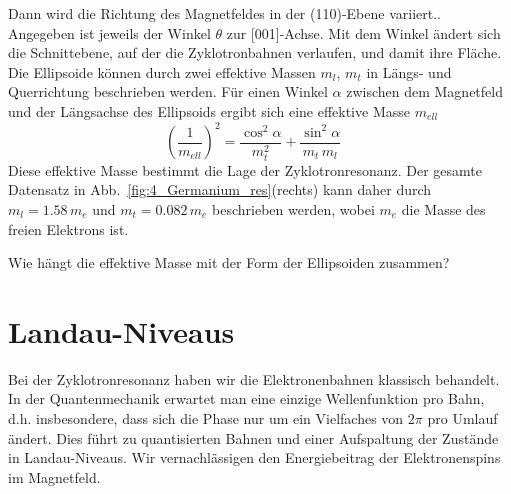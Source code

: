 Dann wird die Richtung des Magnetfeldes in der (110)-Ebene variiert..  Angegeben ist jeweils der Winkel $\theta$ zur [001]-Achse. Mit dem Winkel ändert sich die Schnittebene, auf der die Zyklotronbahnen verlaufen, und damit ihre Fläche. Die Ellipsoide können durch zwei effektive Massen $m_l$, $m_t$ in Längs- und Querrichtung beschrieben werden. Für einen Winkel $\alpha$ zwischen dem Magnetfeld und der Längsachse des Ellipsoids ergibt sich eine effektive Masse $m_{ell}$ 
\begin{equation}
   \left( \frac{1}{m_{ell}} \right)^2 = \frac{\cos^2 \alpha}{m_t^2} + \frac{\sin^2 \alpha}{m_t \, m_l} \quad
\end{equation} 
Diese effektive Masse bestimmt die Lage der Zyklotronresonanz. Der gesamte Datensatz in Abb.~\ref{fig:4_Germanium_res}(rechts) kann daher durch $m_l = 1.58 \, m_e$ und $m_t = 0.082 \, m_e$ beschrieben werden, wobei $m_e$ die Masse des freien Elektrons ist.


\begin{questions}
   \item Wie hängt die effektive Masse mit der  Form der Ellipsoiden zusammen?
\end{questions}




\section{Landau-Niveaus}

Bei der Zyklotronresonanz haben wir die Elektronenbahnen klassisch behandelt. In der Quantenmechanik erwartet man eine einzige Wellenfunktion pro Bahn, d.h. insbesondere, dass sich die Phase nur um ein Vielfaches von $2\pi$ pro Umlauf ändert. Dies führt zu quantisierten Bahnen und einer Aufspaltung der Zustände in Landau-Niveaus. Wir vernachlässigen den Energiebeitrag der Elektronenspins im Magnetfeld.

